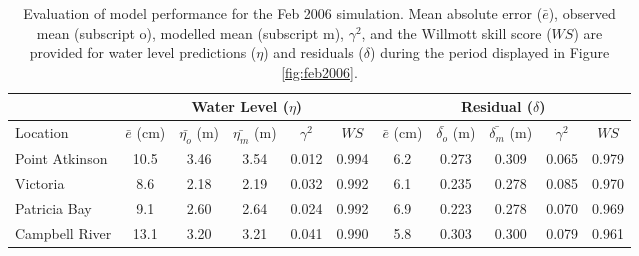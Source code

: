 \documentclass[pdftex,10pt]{article}
\begin{document}
\begin{table}[h]
\centering 
\begin{tabular}{|l |c c c c c | c c c c c|} 
\hline 
& \multicolumn{5}{|c|}{Water Level ($\eta$)}        & \multicolumn{5}{|c|}{Residual ($\delta$)} \\ 
\hline 
Location       & $\bar{e}$ (cm) & $\bar{\eta_{o}}$ (m) & $\bar{\eta_{m}}$ (m) & $\gamma^2$ & $WS$   & $\bar{e}$ (cm) & $\bar{\delta_{o}}$ (m) & $\bar{\delta_{m}}$ (m) & $\gamma^2$ & $WS$ \\
\hline 
Point Atkinson & 10.5           & 3.46                 & 3.54                 &   0.012    & 0.994  & 6.2            &  0.273                 & 0.309                  & 0.065     & 0.979     \\
Victoria       &  8.6           & 2.18                 & 2.19                 &   0.032    & 0.992  & 6.1            &  0.235                 & 0.278                  & 0.085     & 0.970     \\
Patricia Bay   &  9.1           & 2.60                 & 2.64                 &   0.024    & 0.992  & 6.9            &  0.223                 & 0.278                  & 0.070     & 0.969     \\
Campbell River & 13.1           & 3.20                 & 3.21                 &   0.041    & 0.990  & 5.8            &  0.303                 & 0.300                  & 0.079     & 0.961     \\
\hline 
\end{tabular}
\caption{Evaluation of model performance for the Feb 2006 simulation. Mean absolute error ($\bar{e}$), observed mean (subscript o), modelled mean (subscript m), $\gamma^2$, and the Willmott skill score ($WS$) are provided for water level predictions ($\eta$) and residuals ($\delta$) during the period displayed in Figure \ref{fig:feb2006}.}
\label{tab:feb2006stat} 
\end{table} 
\end{document}
